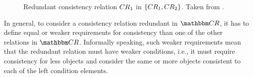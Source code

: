 

\begin{figure}
    \centering
    
    \caption[Redundant consistency relation]{Redundant consistency relation $\consistencyrelation{CR}{1}$ in $\setted{\consistencyrelation{CR}{1}, \consistencyrelation{CR}{2}}$. Taken from .}
    \label{fig:compatibility:redundancyrelationextremes}
\end{figure}

In general, to consider a consistency relation redundant in %
$\consistencyrelationset{CR}$, it has to define equal or weaker requirements for consistency than one of the other relations in $\consistencyrelationset{CR}$.
Informally speaking, such weaker requirements mean that the redundant relation must have weaker conditions, i.e., it must require consistency for less objects and consider the same or more objects consistent to each of the left condition elements. %

